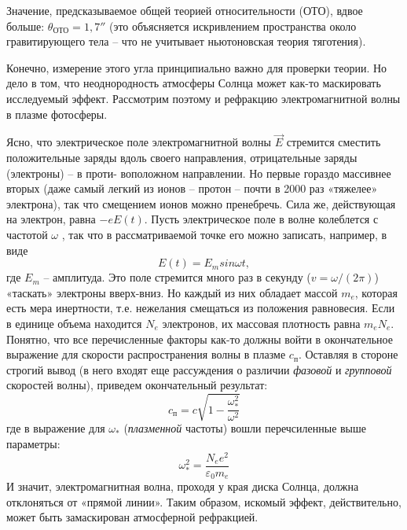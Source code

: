 \begin{multicols}{2}
        \columnbreak
        Значение, предсказываемое общей теорией относительности (ОТО), вдвое больше: $\theta_{\textit{ОТО}} = 1,7''$ (это объясняется искривлением пространства около гравитирующего тела – что не учитывает ньютоновская теория тяготения).
        \par
        Конечно, измерение этого угла принципиально важно для
        проверки теории. Но дело в том, что неоднородность атмосферы Солнца может как-то маскировать исследуемый эффект. Рассмотрим поэтому и рефракцию электромагнитной волны в плазме фотосферы.
        \par
        Ясно, что электрическое поле электромагнитной волны $\overrightarrow{E}$ стремится сместить положительные заряды вдоль своего направления, отрицательные заряды (электроны) – в проти- воположном направлении. Но первые гораздо массивнее вторых (даже самый легкий из ионов – протон – почти в 2000 раз «тяжелее» электрона), так что смещением ионов можно пренебречь. Сила же, действующая на электрон, равна $-eE(t)$. Пусть электрическое поле в волне колеблется с частотой $\omega$ , так что в рассматриваемой точке его можно записать, например, в виде
        \begin{equation*}
            E (t) = E_m sin \omega t,
        \end{equation*}
        где $E_m$ – амплитуда. Это поле стремится много раз в секунду
        ($v=\omega/(2\pi)$) «таскать» электроны вверх-вниз. Но каждый из них обладает массой $m_e$, которая есть мера инертности, т.е. нежелания смещаться из положения равновесия. Если в единице объема находится $N_e$ электронов, их массовая плотность равна $m_e N_e$. Понятно, что все перечисленные факторы как-то должны войти в окончательное выражение для скорости распространения волны в плазме $c_{\textit{п}}$. Оставляя в стороне строгий вывод (в него входят еще рассуждения о различии \emph{фазовой} и \emph{групповой} скоростей волны), приведем окончательный результат:
        \begin{equation*}
            c_{\textit{п}}=c\sqrt{1-\frac{\omega_{*}^2}{\omega^2}}
        \end{equation*}
        где в выражение для $\omega_{*}$ (\emph{плазменной} частоты) вошли перечсиленные выше параметры:
        \begin{equation}
            \omega_{*}^2 = \frac{N_e e^2}{\varepsilon_0 m_e}
        \end{equation}
        И значит, электромагнитная волна, проходя у края диска Солнца, должна отклоняться от «прямой линии». Таким образом, искомый эффект, действительно, может быть замаскирован атмосферной рефракцией.

\end{multicols}
